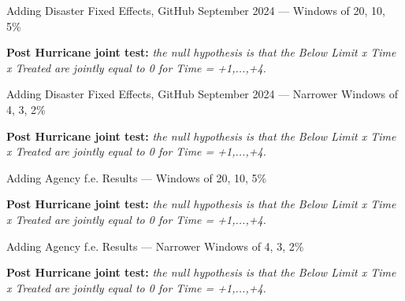 \documentclass{article}
\begin{document}
\clearpage
\pagebreak

\begin{sidewaystable}
    
    \caption{Adding Disaster Fixed Effects, GitHub September 2024 --- Windows of 20, 10, 5\%}
    
    \begin{center}
    
    \end{center}
    
    \textbf{Post Hurricane joint test:} \emph{the null hypothesis is that the Below Limit x Time x Treated are jointly equal to 0 for Time = +1,...,+4.}

    \end{sidewaystable}
    
\clearpage
\pagebreak
    
\begin{sidewaystable}
        
    \caption{Adding Disaster Fixed Effects, GitHub September 2024 --- Narrower Windows of 4, 3, 2\%}
    
    \begin{center}
    
    \end{center}
        
    \textbf{Post Hurricane joint test:} \emph{the null hypothesis is that the Below Limit x Time x Treated are jointly equal to 0 for Time = +1,...,+4.}

\end{sidewaystable}
        
\clearpage
\pagebreak

\begin{sidewaystable}
    
    \caption{Adding Agency f.e. Results --- Windows of 20, 10, 5\%}
            
    \begin{center}
    
    \end{center}
            
    \textbf{Post Hurricane joint test:} \emph{the null hypothesis is that the Below Limit x Time x Treated are jointly equal to 0 for Time = +1,...,+4.}

\end{sidewaystable}
            
\clearpage
\pagebreak
            
\begin{sidewaystable}
                
    \caption{Adding Agency f.e. Results --- Narrower Windows of 4, 3, 2\%}
                
    \begin{center}
    
    \end{center}
                

    \textbf{Post Hurricane joint test:} \emph{the null hypothesis is that the Below Limit x Time x Treated are jointly equal to 0 for Time = +1,...,+4.}
    \end{sidewaystable}
\end{document}
